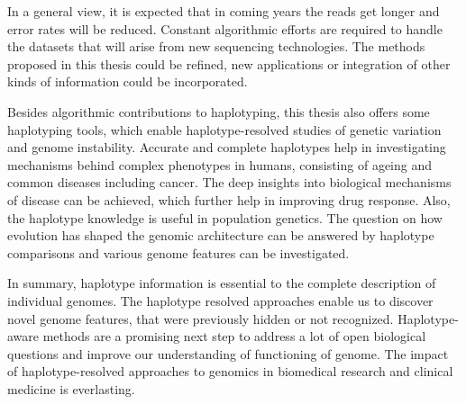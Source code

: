 In a general view, it is expected that in coming years the reads get longer and error rates will be reduced.
Constant algorithmic efforts are required to handle the datasets that will arise from new sequencing technologies.
The methods proposed in this thesis could be refined, new applications or integration of other kinds of information could be incorporated.

Besides algorithmic contributions to haplotyping, this thesis also offers some haplotyping tools, which enable haplotype-resolved studies of genetic variation and genome instability.
Accurate and complete haplotypes help in investigating mechanisms behind complex phenotypes in humans, consisting of ageing and common diseases including cancer. 
The deep insights into biological mechanisms of disease can be achieved, which further help in improving drug response.
Also, the haplotype knowledge is useful in population genetics.
The question on how evolution has shaped the genomic architecture can be answered by haplotype comparisons and various genome features can be investigated.

In summary, haplotype information is essential to the complete description of individual genomes. The haplotype resolved approaches enable us to discover novel genome features, that were previously hidden or not recognized.
Haplotype-aware methods are a promising next step to address a lot of open biological questions and improve our understanding of functioning of genome.
The impact of haplotype-resolved approaches to genomics in biomedical research and clinical medicine is everlasting.


